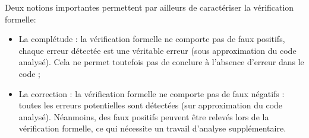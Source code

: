 Deux notions importantes permettent par ailleurs de caractériser la vérification formelle:
\begin{itemize}
	\item La complétude : la vérification formelle ne comporte pas de faux positifs, chaque erreur détectée est une véritable erreur (sous approximation du code analysé). Cela ne permet toutefois pas de conclure à l'absence d'erreur dans le code ;
	\item La correction : la vérification formelle ne comporte pas de faux négatifs : toutes les erreurs potentielles sont détectées (sur approximation du code analysé). Néanmoins, des faux positifs peuvent être relevés lors de la vérification formelle, ce qui nécessite un travail d'analyse supplémentaire.
\end{itemize}



